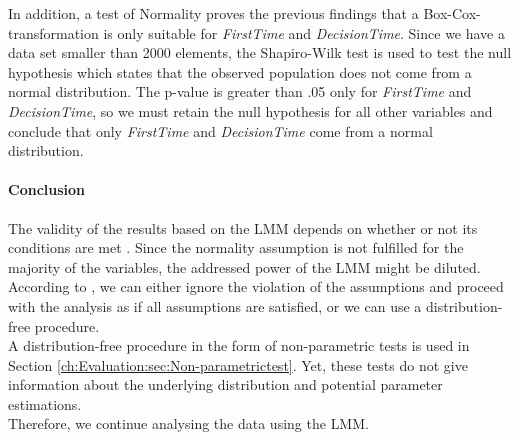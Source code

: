 In addition, a test of Normality proves the previous findings that a Box-Cox-transformation is only suitable for \textit{FirstTime} and \textit{DecisionTime}. Since we have a data set smaller than 2000 elements, the Shapiro-Wilk test \citep{Shapiro1965} is used to test the null hypothesis which states that the observed population does not come from a normal distribution. The p-value is greater than .05 only for \textit{FirstTime} and \textit{DecisionTime}, so we must retain the null hypothesis for all other variables and conclude that only \textit{FirstTime} and \textit{DecisionTime} come from a normal distribution.

\paragraph{Conclusion}
The validity of the results based on the \ac{LMM} depends on whether or not its conditions are met \citep{Siegel1957}. Since the normality assumption is not fulfilled for the majority of the variables, the addressed power of the \ac{LMM} might be diluted. \\
According to \cite{Graybill1976}, we can either ignore the violation of the assumptions and proceed with the analysis as if all assumptions are satisfied, or we can use a distribution-free procedure. \\
A distribution-free procedure in the form of non-parametric tests is used in Section \ref{ch:Evaluation:sec:Non-parametrictest}. Yet, these tests do not give information about the underlying distribution and potential parameter estimations.\\
Therefore, we continue analysing the data using the \ac{LMM}.

